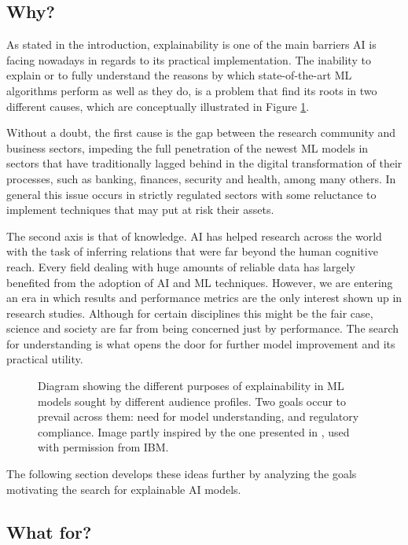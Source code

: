 \documentclass[final]{elsarticle}
\begin{document}
\subsection{Why?}

As stated in the introduction, explainability is one of the main barriers AI is facing nowadays in regards to its practical implementation. The inability to explain or to fully understand the reasons by which state-of-the-art ML algorithms perform as well as they do, is a problem that find its roots in two different causes, which are conceptually illustrated in Figure \ref{fig:audiences}. 

Without a doubt, the first cause is the gap between the research community and business sectors, impeding the full penetration of the newest ML models in sectors that have traditionally lagged behind in the digital transformation of their processes, such as banking, finances, security and health, among many others. In general this issue occurs in strictly regulated sectors with some reluctance to implement techniques that may put at risk their assets. 

The second axis is that of knowledge. AI has helped research across the world with the task of inferring relations that were far beyond the human cognitive reach. Every field dealing with huge amounts of reliable data has largely benefited from the adoption of AI and ML techniques. However, we are entering an era in which results and performance metrics are the only interest shown up in research studies. Although for certain disciplines this might be the fair case, science and society are far from being concerned just by performance. The search for understanding is what opens the door for further model improvement and its practical utility.
\begin{figure}[h]
\caption{Diagram showing the different purposes of explainability in ML models sought by different audience profiles. Two goals occur to prevail across them: need for model understanding, and regulatory compliance. Image partly inspired by the one presented in \cite{ibm2019}, used with permission from IBM.} 
\label{fig:audiences}
\end{figure}

The following section develops these ideas further by analyzing the goals motivating the search for explainable AI models.

\subsection{What for?}
\end{document}
